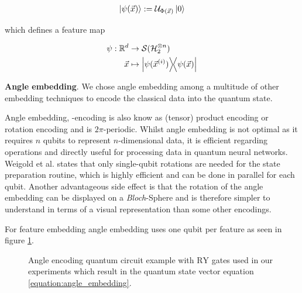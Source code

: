\begin{equation} 
    \centering
    \begin{split}
        \ket{\psi(\vec{x})} := \mathcal{U}_{\Phi(\Vec{x})}\ket{0}
    \end{split}
    \label{equation:vqa_embedding_state}
\end{equation}

which defines a feature map

\begin{equation}
    \centering
    \begin{split}
        \psi: \mathbb{R}^d & \rightarrow \mathcal{S}(\mathcal{H}_2^{\otimes n}) \\
        \vec{x} & \mapsto \op{\psi(\vec{x}^{(i)})}{\psi(\vec{x})}
    \end{split}
    \label{equation:vqa_feature_map}
\end{equation}


\textbf{Angle embedding}. We chose angle embedding among a multitude of other embedding techniques\cite{schuld_SQMLmodelsAreKernelMethods} to encode the classical data into the quantum state. \par

Angle embedding, -encoding is also know as (tensor) product encoding or rotation encoding and is $2\pi$-periodic\cite{schuld_SQMLmodelsAreKernelMethods}. Whilst angle embedding is not optimal as it requires $n$ qubits to represent $n$-dimensional data, it is efficient regarding operations and directly useful for processing data in quantum neural networks\cite{leymannBitterTruthGatebased2020}. Weigold et al. states that only single-qubit rotations are needed for the state preparation routine, which is highly efficient and can be done in parallel for each qubit\cite{Weigold2021_EncodingPatternsForQuantumAlgorithms}. Another advantageous side effect is that the rotation of the angle embedding can be displayed on a \emph{Bloch}-Sphere and is therefore simpler to understand in terms of a visual representation than some other encodings. \par

For feature embedding angle embedding uses one qubit per feature as seen in figure \ref{fig:qnn_feature_encoding}.

\begin{figure}[!h]
    \centering
    \caption{Angle encoding quantum circuit example with $\mathrm{RY}$ gates used in our experiments which result in the quantum state vector equation \ref{equation:angle_embedding}.}
    \label{fig:qnn_feature_encoding}
\end{figure}

